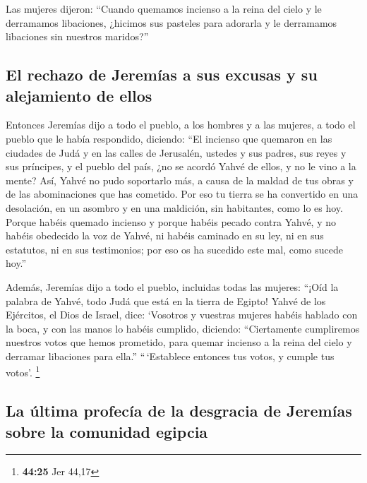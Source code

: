  Las mujeres dijeron: ``Cuando quemamos incienso a la
reina del cielo y le derramamos libaciones, ¿hicimos sus pasteles para
adorarla y le derramamos libaciones sin nuestros maridos?''

\hypertarget{el-rechazo-de-jeremuxedas-a-sus-excusas-y-su-alejamiento-de-ellos}{%
\subsection{El rechazo de Jeremías a sus excusas y su alejamiento de
ellos}\label{el-rechazo-de-jeremuxedas-a-sus-excusas-y-su-alejamiento-de-ellos}}

 Entonces Jeremías dijo a todo el pueblo, a los hombres y
a las mujeres, a todo el pueblo que le había respondido, diciendo:
 ``El incienso que quemaron en las ciudades de Judá y en
las calles de Jerusalén, ustedes y sus padres, sus reyes y sus
príncipes, y el pueblo del país, ¿no se acordó Yahvé de ellos, y no le
vino a la mente?  Así, Yahvé no pudo soportarlo más, a
causa de la maldad de tus obras y de las abominaciones que has cometido.
Por eso tu tierra se ha convertido en una desolación, en un asombro y en
una maldición, sin habitantes, como lo es hoy.  Porque
habéis quemado incienso y porque habéis pecado contra Yahvé, y no habéis
obedecido la voz de Yahvé, ni habéis caminado en su ley, ni en sus
estatutos, ni en sus testimonios; por eso os ha sucedido este mal, como
sucede hoy.''

 Además, Jeremías dijo a todo el pueblo, incluidas todas
las mujeres: ``¡Oíd la palabra de Yahvé, todo Judá que está en la tierra
de Egipto!  Yahvé de los Ejércitos, el Dios de Israel,
dice: `Vosotros y vuestras mujeres habéis hablado con la boca, y con las
manos lo habéis cumplido, diciendo: ``Ciertamente cumpliremos nuestros
votos que hemos prometido, para quemar incienso a la reina del cielo y
derramar libaciones para ella.'' ``\,`Establece entonces tus votos, y
cumple tus votos'. \footnote{\textbf{44:25} Jer 44,17}

\hypertarget{la-uxfaltima-profecuxeda-de-la-desgracia-de-jeremuxedas-sobre-la-comunidad-egipcia}{%
\subsection{La última profecía de la desgracia de Jeremías sobre la
comunidad
egipcia}\label{la-uxfaltima-profecuxeda-de-la-desgracia-de-jeremuxedas-sobre-la-comunidad-egipcia}}

